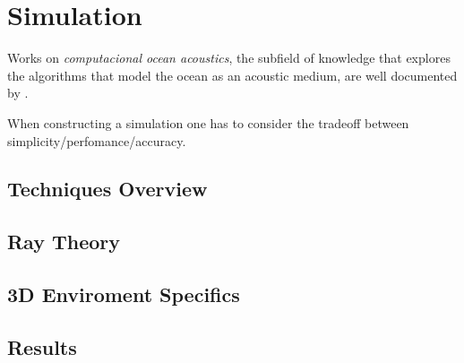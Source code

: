 \section{Simulation}

Works on \textit{computacional ocean
acoustics}, the subfield of knowledge that explores the algorithms that model
the ocean as an acoustic medium, are well documented by
\citet{Etter2013}.

When constructing a simulation one has to consider the tradeoff between
simplicity/perfomance/accuracy.

\subsection{Techniques Overview}
\subsection{Ray Theory}
\subsection{3D Enviroment Specifics}
\subsection{Results}
